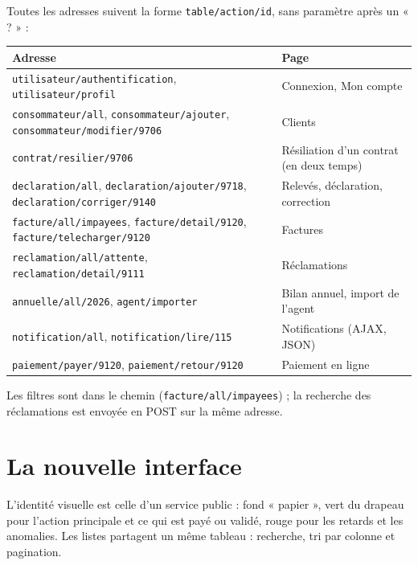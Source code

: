 \documentclass[11pt,a4paper]{article}
\begin{document}
Toutes les adresses suivent la forme \texttt{table/action/id}, sans paramètre après un « ? » :
\begin{center}\footnotesize
\begin{tabularx}{\linewidth}{>{\raggedright\arraybackslash}X>{\raggedright\arraybackslash}p{4.4cm}}
\toprule
\textbf{Adresse} & \textbf{Page} \\
\midrule
\texttt{utilisateur/authentification}, \texttt{utilisateur/profil} & Connexion, Mon compte \\
\texttt{consommateur/all}, \texttt{consommateur/ajouter}, \texttt{consommateur/modifier/9706} & Clients \\
\texttt{contrat/resilier/9706} & Résiliation d'un contrat (en deux temps) \\
\texttt{declaration/all}, \texttt{declaration/ajouter/9718}, \texttt{declaration/corriger/9140} & Relevés, déclaration, correction \\
\texttt{facture/all/impayees}, \texttt{facture/detail/9120}, \texttt{facture/telecharger/9120} & Factures \\
\texttt{reclamation/all/attente}, \texttt{reclamation/detail/9111} & Réclamations \\
\texttt{annuelle/all/2026}, \texttt{agent/importer} & Bilan annuel, import de l'agent \\
\texttt{notification/all}, \texttt{notification/lire/115} & Notifications (AJAX, JSON) \\
\texttt{paiement/payer/9120}, \texttt{paiement/retour/9120} & Paiement en ligne \\
\bottomrule
\end{tabularx}
\end{center}
Les filtres sont dans le chemin (\texttt{facture/all/impayees}) ; la recherche des réclamations est envoyée en
POST sur la même adresse.

\section{La nouvelle interface}
L'identité visuelle est celle d'un service public : fond « papier », vert du drapeau pour l'action principale
et ce qui est payé ou validé, rouge pour les retards et les anomalies. Les listes partagent un même tableau :
recherche, tri par colonne et pagination.
\end{document}

